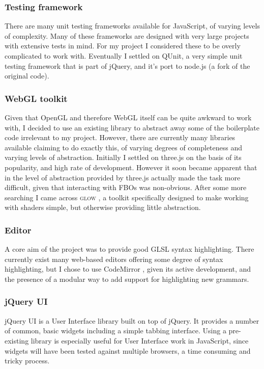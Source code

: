 \documentclass[12pt,twoside,notitlepage]{report}
\begin{document}
\subsubsection{Testing framework}
There are many unit testing frameworks available for JavaScript, of varying levels of complexity. Many of these frameworks are designed with very large projects with extensive tests in mind. For my project I considered these to be overly complicated to work with. Eventually I settled on QUnit, a very simple unit testing framework that is part of jQuery, and it's port to node.js (a fork of the original code).

\subsubsection{WebGL toolkit}
Given that OpenGL and therefore WebGL itself can be quite awkward to work with, I decided to use an existing library to abstract away some of the boilerplate code irrelevant to my project. However, there are currently many libraries available claiming to do exactly this, of varying degrees of completeness and varying levels of abstraction. Initially I settled on three.js \cite{three} on the basis of its popularity, and high rate of development. However it soon became apparent that in the level of abstraction provided by three.js actually made the task more difficult, given that interacting with FBOs was non-obvious. After some more searching I came across \textsc{glow} \cite{glow}, a toolkit specifically designed to make working with shaders simple, but otherwise providing little abstraction.

\subsubsection{Editor}
\label{cmirror}
A core aim of the project was to provide good GLSL syntax highlighting. There currently exist many web-based editors offering some degree of syntax highlighting, but I chose to use CodeMirror \cite{codemirror}, given its active development, and the presence of a modular way to add support for highlighting new grammars. 

\subsubsection{jQuery UI}
jQuery UI is a User Interface library built on top of jQuery. It provides a number of common, basic widgets including a simple tabbing interface. Using a pre-existing library is especially useful for User Interface work in JavaScript, since widgets will have been tested against multiple browsers, a time consuming and tricky process.
\end{document}
